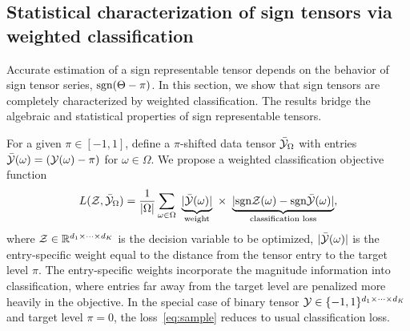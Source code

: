 \documentclass[11pt]{article}
\theoremstyle{plain}
\theoremstyle{definition}
\newcommand*{\KeepStyleUnderBrace}[1]{%
  \mathop{%
    \mathchoice
    {\underbrace{\displaystyle#1}}%
    {\underbrace{\textstyle#1}}%
    {\underbrace{\scriptstyle#1}}%
    {\underbrace{\scriptscriptstyle#1}}%
  }\limits
}
\def\sign{\textup{sgn}}
\begin{document}
\subsection{Statistical characterization of sign tensors via weighted classification}\label{sec:identifiability}

Accurate estimation of a sign representable tensor depends on the behavior of sign tensor series, $\sign(\Theta-\pi)$. In this section, we show that sign tensors are completely characterized by weighted classification. The results bridge the algebraic and statistical properties of sign representable tensors.
 
For a given $\pi \in [-1,1]$, define a $\pi$-shifted data tensor $\bar {\mathcal{Y}}_\Omega$ with entries $\bar {\mathcal{Y}}(\omega) = (\mathcal{Y}(\omega)-\pi)$ for $\omega\in \Omega$. We propose a weighted classification objective function
\begin{equation}\label{eq:sample}
L(\tZ, \bar \tY_\Omega)= {1\over |\Omega|}\sum_{\omega \in \Omega}\ \KeepStyleUnderBrace{|\bar \tY(\omega)|}_{\text{weight}}\  \times \ \KeepStyleUnderBrace{| \sign \tZ(\omega)-\sign \bar \tY(\omega)|}_{\text{classification loss}},
\end{equation}
where $\mathcal{Z}\in\mathbb{R}^{d_1\times \cdots \times d_K}$ is the decision variable to be optimized, $|\bar {\mathcal{Y}}(\omega)|$ is the entry-specific weight equal to the distance from the tensor entry to the target level $\pi$. The entry-specific weights incorporate the magnitude information into classification, where entries far away from the target level are penalized more heavily in the objective. In the special case of binary tensor $\mathcal{Y}\in\{-1,1\}^{d_1\times\cdots\times d_K}$ and target level $\pi=0$, the loss~\eqref{eq:sample} reduces to usual classification loss. 
\end{document}
